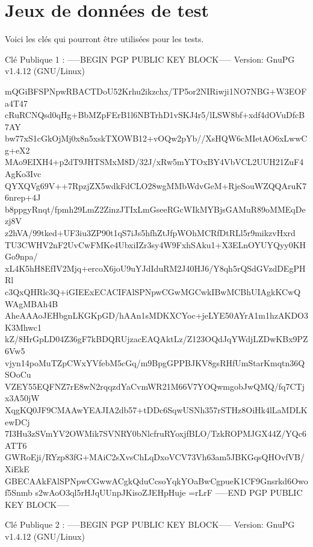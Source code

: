 \documentclass{../res/univ-projet}
\begin{document}
\section{Jeux de données de test}

Voici les clés qui pourront être utilisées pour les tests.

Clé Publique 1 :
-----BEGIN PGP PUBLIC KEY BLOCK-----
Version: GnuPG v1.4.12 (GNU/Linux)

mQGiBFSPNpwRBACTDoU52Krhu2ikzchx/TP5or2NIRiwji1NO7NBG+W3EOFa4T47
cRuRCNQsd0qHg+BbMZpFErB1l6NBTrhD1vSKJ4r5/lLSW8bf+xdf4dOVuDfcB7AY
bw77xS1cGkOjMj0x8n5xskTXOWB12+vOQw2pYb//XsHQW6cMIetAO6xLwwCg+eX2
MAo9EIXH4+p2dT9JHTSMxM8D/32J/xRw5mYTOxBY4VbVCL2UUH21ZuF4AgKo3Ivc
QYXQVg69V++7RpzjZX5wdkFdCLO28wgMMbWdvGeM+RjeSouWZQQAruK76nrep+4J
b8ppgyRnqt/fpmh29LmZ2ZinzJTIxLmGseeRGcWIkMYBjsGAMuR89oMMEqDezj8V
z2hVA/99tked+UF3iu3ZP90t1qS7iJs5hfhZtJfpWOhMCRfDtRLl5r9mikzvHxrd
TU3CWHV2nF2UvCwFMKe4UbxiIZr3sy4W9FxhSAku1+X3ELnOYUYQyy0KHGo9npa/
xL4K5hH8EfIV2Mjq+ercoX6joU9uYJdIduRM2J40HJ6/Y8qh5rQSdGVzdDEgPHRl
c3QxQHRlc3Q+iGIEExECACIFAlSPNpwCGwMGCwkIBwMCBhUIAgkKCwQWAgMBAh4B
AheAAAoJEHbgnLKGKpGD/hAAn1sMDKXCYoc+jeLYE50AYrA1m1hzAKDO3K3Mhwc1
kZ/8HrGpLD04Z36gF7kBDQRUjzacEAQAktLz/Z123OQdJqYWdjLZDwKBx9PZ6Vw5
vjyn14poMuTZpCWxYVfebM5cGq/m9BpgGPPBJKV8gsRHfUmStarKmqtn36QSOoCu
VZEY55EQFNZ7rE8wN2rqqzdYaCvmWR21M66V7YOQwmgobJwQMQ/fq7CTjx3A50jW
XqgKQ0JF9CMAAwYEAJIA2db57+tDDc6SqwUSNh357rSTHz8OiHk4lLaMDLKewDCj
7I3Hu3zSVmYV2OWMik7SVNRY0bNlcfruRYoxjfBLO/TzkROPMJGX44Z/YQc6ATT6
GWRoEji/RYzp83fG+MAiC2sXvsChLqDxoVCV73Vh63am5JBKGqsQHOvfVB/XiEkE
GBECAAkFAlSPNpwCGwwACgkQduCcsoYqkYOaBwCgpueK1CF9Gnsrkd6Owof5Snmb
s2wAoO3ql5rHJqUUnpJKisoZJEHpHuje
=rLrF
-----END PGP PUBLIC KEY BLOCK-----


Clé Publique 2 :
-----BEGIN PGP PUBLIC KEY BLOCK-----
Version: GnuPG v1.4.12 (GNU/Linux)
\end{document}
